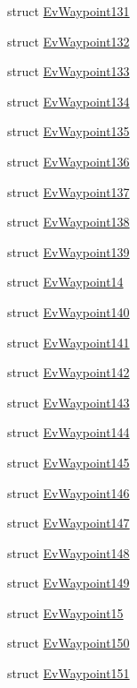 \begin{DoxyCompactItemize}
\item 
struct \hyperlink{structsmacc_1_1EvWaypoint131}{Ev\+Waypoint131}
\item 
struct \hyperlink{structsmacc_1_1EvWaypoint132}{Ev\+Waypoint132}
\item 
struct \hyperlink{structsmacc_1_1EvWaypoint133}{Ev\+Waypoint133}
\item 
struct \hyperlink{structsmacc_1_1EvWaypoint134}{Ev\+Waypoint134}
\item 
struct \hyperlink{structsmacc_1_1EvWaypoint135}{Ev\+Waypoint135}
\item 
struct \hyperlink{structsmacc_1_1EvWaypoint136}{Ev\+Waypoint136}
\item 
struct \hyperlink{structsmacc_1_1EvWaypoint137}{Ev\+Waypoint137}
\item 
struct \hyperlink{structsmacc_1_1EvWaypoint138}{Ev\+Waypoint138}
\item 
struct \hyperlink{structsmacc_1_1EvWaypoint139}{Ev\+Waypoint139}
\item 
struct \hyperlink{structsmacc_1_1EvWaypoint14}{Ev\+Waypoint14}
\item 
struct \hyperlink{structsmacc_1_1EvWaypoint140}{Ev\+Waypoint140}
\item 
struct \hyperlink{structsmacc_1_1EvWaypoint141}{Ev\+Waypoint141}
\item 
struct \hyperlink{structsmacc_1_1EvWaypoint142}{Ev\+Waypoint142}
\item 
struct \hyperlink{structsmacc_1_1EvWaypoint143}{Ev\+Waypoint143}
\item 
struct \hyperlink{structsmacc_1_1EvWaypoint144}{Ev\+Waypoint144}
\item 
struct \hyperlink{structsmacc_1_1EvWaypoint145}{Ev\+Waypoint145}
\item 
struct \hyperlink{structsmacc_1_1EvWaypoint146}{Ev\+Waypoint146}
\item 
struct \hyperlink{structsmacc_1_1EvWaypoint147}{Ev\+Waypoint147}
\item 
struct \hyperlink{structsmacc_1_1EvWaypoint148}{Ev\+Waypoint148}
\item 
struct \hyperlink{structsmacc_1_1EvWaypoint149}{Ev\+Waypoint149}
\item 
struct \hyperlink{structsmacc_1_1EvWaypoint15}{Ev\+Waypoint15}
\item 
struct \hyperlink{structsmacc_1_1EvWaypoint150}{Ev\+Waypoint150}
\item 
struct \hyperlink{structsmacc_1_1EvWaypoint151}{Ev\+Waypoint151}
\item 

\end{DoxyCompactItemize}
